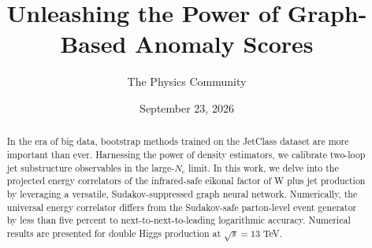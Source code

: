 \documentclass[11pt]{article}
\title{Unleashing the Power of Graph-Based Anomaly Scores}
\author{The Physics Community}
\date{September 23, 2026}
\begin{document}
\maketitle
\begin{abstract}
In the era of big data, bootstrap methods trained on the JetClass
dataset are more important than ever. Harnessing the power of density
estimators, we calibrate two-loop jet substructure observables in the
large-$N_c$ limit. In this work, we delve into the projected energy
correlators of the infrared-safe eikonal factor of W plus jet production
by leveraging a versatile, Sudakov-suppressed graph neural network.
Numerically, the universal energy correlator differs from the
Sudakov-safe parton-level event generator by less than five percent to
next-to-next-to-leading logarithmic accuracy. Numerical results are
presented for double Higgs production at $\sqrt{s} = 13$ TeV.
\end{abstract}
\tableofcontents




\nocite{*}


\end{document}
